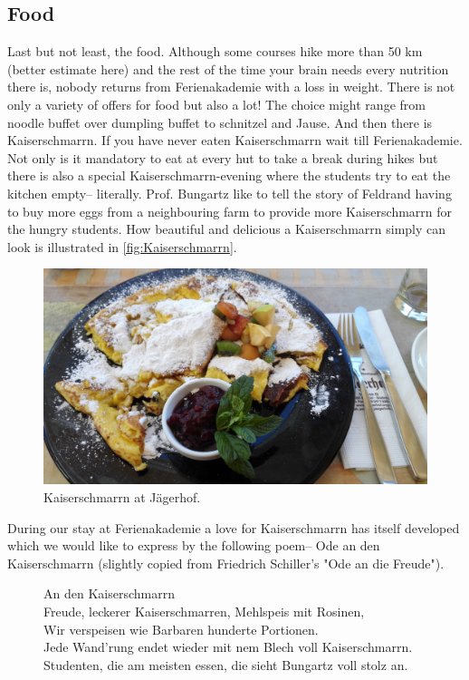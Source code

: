 \subsection{Food}
Last but not least, the food. Although some courses hike more than 50 km (better estimate here) and the rest of the time your brain needs every nutrition there is, nobody returns from Ferienakademie with a loss in weight. There is not only a variety of offers for food but also a lot! The choice might range from noodle buffet over dumpling buffet to schnitzel and Jause. And then there is Kaiserschmarrn. If you have never eaten Kaiserschmarrn wait till Ferienakademie. Not only is it mandatory to eat at every hut to take a break during hikes but there is also a special Kaiserschmarrn-evening where the students try to eat the kitchen empty-- literally. Prof. Bungartz like to tell the story of Feldrand having to buy more eggs from a neighbouring farm to provide more Kaiserschmarrn for the hungry students. How beautiful and delicious a Kaiserschmarrn simply can look is illustrated in \autoref{fig:Kaiserschmarrn}.
\begin{figure}[ht]%
 	\begin{center}%
 		\includegraphics[scale=0.05]{img/Kaiserschmarrn.jpg}%
 		\caption{Kaiserschmarrn at Jägerhof.}\label{fig:Kaiserschmarrn}%
 	\end{center}%
\end{figure}

During our stay at Ferienakademie a love for Kaiserschmarrn has itself developed which we would like to express by the following poem-- Ode an den Kaiserschmarrn (slightly copied from Friedrich Schiller's "Ode an die Freude"). 
\begin{figure}[ht]
\begin{framed}
An den Kaiserschmarrn \\

Freude, leckerer Kaiserschmarren,
Mehlspeis mit Rosinen,\\
Wir verspeisen wie Barbaren
hunderte Portionen.\\

Jede Wand'rung endet wieder
mit nem Blech voll Kaiserschmarrn.\\
Studenten, die am meisten essen,
die sieht Bungartz voll stolz an.
\end{framed}
\end{figure}
\vfill
